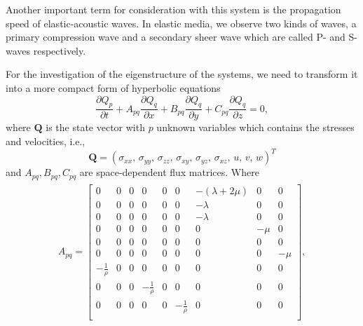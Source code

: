 Another important term for consideration with this system is the propagation speed of elastic-acoustic waves. In elastic media, we 
observe two kinds of waves, a primary compression wave and a secondary sheer wave which are called P- and S-waves respectively.

For the investigation of the eigenstructure of the systems, we need to transform it into a more compact form of hyperbolic equations
\begin{equation}
    \frac{\partial Q_p}{\partial t} + A_{pq} \frac{\partial Q_q}{\partial x} + 
    B_{pq} \frac{\partial Q_q}{\partial y} + C_{pq} \frac{\partial Q_q}{\partial z} = 0,
    \label{eq:compactform}
\end{equation}
where $\mathbf{Q}$ is the state vector with $p$ unknown variables which contains the stresses and velocities, i.e.,
\begin{equation}
    \mathbf{Q} = \left(\sigma_{xx}, \, \sigma_{yy}, \, \sigma_{zz}, \, \sigma_{xy}, \, \sigma_{yz}, \, \sigma_{xz}, \, u, \, v, \, w \right)^T
\end{equation}
and $A_{pq}, B_{pq}, C_{pq}$ are space-dependent flux matrices. Where
\begin{align}
    \begin{split}
    A_{pq} = 
        \begin{bmatrix}
        0 & 0 & 0 & 0 & 0 & 0 & -\left(\lambda + 2\mu\right) & 0 & 0 \\
        0 & 0 & 0 & 0 & 0 & 0 & -\lambda                     & 0 & 0 \\
        0 & 0 & 0 & 0 & 0 & 0 & -\lambda                     & 0 & 0 \\
        0 & 0 & 0 & 0 & 0 & 0 & 0                   & -\mu & 0 \\
        0 & 0 & 0 & 0 & 0 & 0 & 0                   & 0 & 0 \\
        0 & 0 & 0 & 0 & 0 & 0 & 0                   & 0 & -\mu \\
        -\frac{1}{\rho} & 0 & 0 & 0 & 0 & 0 & 0                   & 0 & 0 \\
        0 & 0 & 0 & -\frac{1}{\rho} & 0 & 0 & 0                   & 0 & 0 \\
        0 & 0 & 0 & 0 & 0 & -\frac{1}{\rho} & 0                   & 0 & 0 \\
    \end{bmatrix},
    \end{split}
    \label{eq:fluxmatrix}
\end{align}

